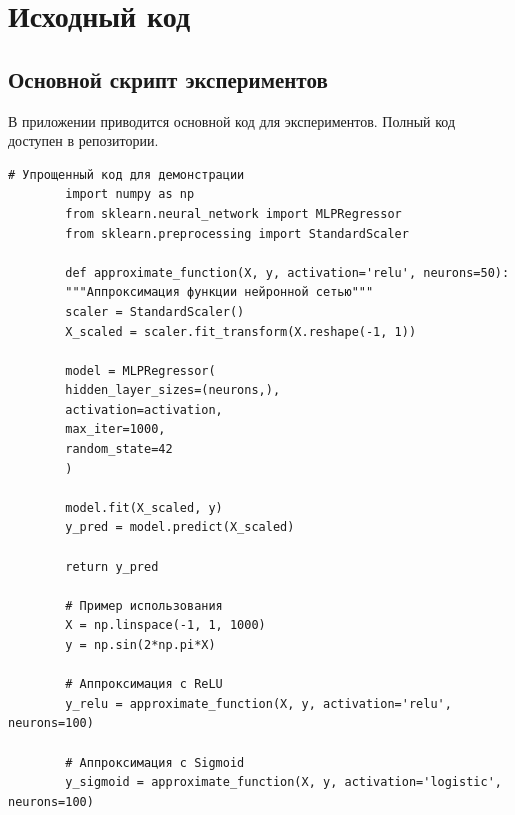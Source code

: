 \documentclass[12pt]{article}
\begin{document}
	\newpage
	\nocite{*}  %
	\printbibliography[title={Список литературы}]
	
	\appendix
	\section{Исходный код}
	
	\subsection{Основной скрипт экспериментов}
	В приложении приводится основной код для экспериментов. Полный код доступен в репозитории.
	
	\begin{lstlisting}[caption={Основные функции для экспериментов}, label={lst:main_code}]
		# Упрощенный код для демонстрации
		import numpy as np
		from sklearn.neural_network import MLPRegressor
		from sklearn.preprocessing import StandardScaler
		
		def approximate_function(X, y, activation='relu', neurons=50):
		"""Аппроксимация функции нейронной сетью"""
		scaler = StandardScaler()
		X_scaled = scaler.fit_transform(X.reshape(-1, 1))
		
		model = MLPRegressor(
		hidden_layer_sizes=(neurons,),
		activation=activation,
		max_iter=1000,
		random_state=42
		)
		
		model.fit(X_scaled, y)
		y_pred = model.predict(X_scaled)
		
		return y_pred
		
		# Пример использования
		X = np.linspace(-1, 1, 1000)
		y = np.sin(2*np.pi*X)
		
		# Аппроксимация с ReLU
		y_relu = approximate_function(X, y, activation='relu', neurons=100)
		
		# Аппроксимация с Sigmoid
		y_sigmoid = approximate_function(X, y, activation='logistic', neurons=100)
	\end{lstlisting}
	
\end{document}
